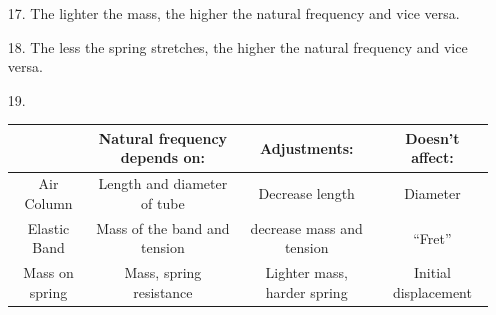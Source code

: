 \begin{itemize}
        \pagebreak

        \item [17.] The lighter the mass, the higher the natural frequency and vice versa.
        \item [18.] The less the spring stretches, the higher the natural frequency and vice versa.
        \item [19.] \mbox{}\\
        
        \begin{center}
            \begin{tabular}{c | c | c | c}
                & Natural frequency depends on: & Adjustments: & Doesn't affect: \\
                \hline
                Air Column & Length and diameter of tube & Decrease length & Diameter   \\
                \hline
                Elastic Band & Mass of the band and tension & decrease mass and tension & ``Fret''   \\
                \hline
                Mass on spring & Mass, spring resistance & Lighter mass, harder spring & Initial displacement   \\
            \end{tabular}
        \end{center}

    \end{itemize}

